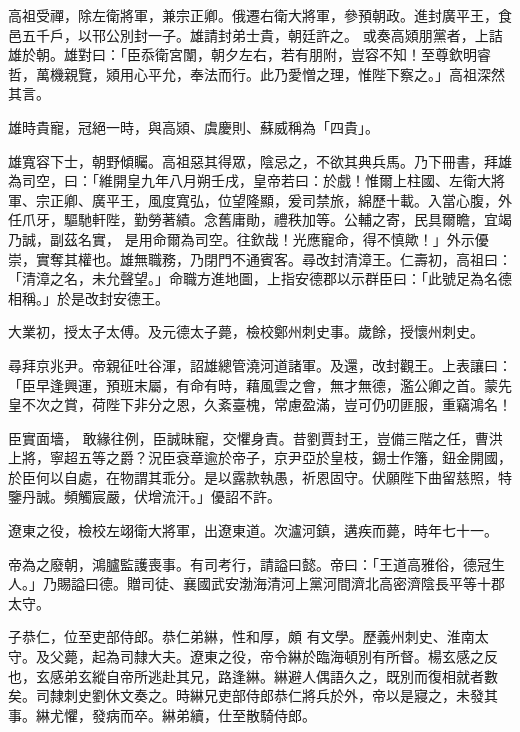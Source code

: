\begin{pinyinscope}
 高祖受禪，除左衛將軍，兼宗正卿。俄遷右衛大將軍，參預朝政。進封廣平王，食邑五千戶，以邗公別封一子。雄請封弟士貴，朝廷許之。
 或奏高熲朋黨者，上詰雄於朝。雄對曰：「臣忝衛宮闈，朝夕左右，若有朋附，豈容不知！至尊欽明睿哲，萬機親覽，熲用心平允，奉法而行。此乃愛憎之理，惟陛下察之。」高祖深然其言。



 雄時貴寵，冠絕一時，與高熲、虞慶則、蘇威稱為「四貴」。



 雄寬容下士，朝野傾矚。高祖惡其得眾，陰忌之，不欲其典兵馬。乃下冊書，拜雄為司空，曰：「維開皇九年八月朔壬戌，皇帝若曰：於戲！惟爾上柱國、左衛大將軍、宗正卿、廣平王，風度寬弘，位望隆顯，爰司禁旅，綿歷十載。入當心腹，外任爪牙，驅馳軒陛，勤勞著績。念舊庸勛，禮秩加等。公輔之寄，民具爾瞻，宜竭乃誠，副茲名實，
 是用命爾為司空。往欽哉！光應寵命，得不慎歟！」外示優崇，實奪其權也。雄無職務，乃閉門不通賓客。尋改封清漳王。仁壽初，高祖曰：「清漳之名，未允聲望。」命職方進地圖，上指安德郡以示群臣曰：「此號足為名德相稱。」於是改封安德王。



 大業初，授太子太傅。及元德太子薨，檢校鄭州刺史事。歲餘，授懷州刺史。



 尋拜京兆尹。帝親征吐谷渾，詔雄總管澆河道諸軍。及還，改封觀王。上表讓曰：「臣早逢興運，預班末屬，有命有時，藉風雲之會，無才無德，濫公卿之首。蒙先皇不次之賞，荷陛下非分之恩，久紊臺槐，常慮盈滿，豈可仍叨匪服，重竊鴻名！



 臣實面墻，
 敢緣往例，臣誠昧寵，交懼身責。昔劉賈封王，豈備三階之任，曹洪上將，寧超五等之爵？況臣袞章逾於帝子，京尹亞於皇枝，錫士作籓，鈕金開國，於臣何以自處，在物謂其乖分。是以露款執愚，祈恩固守。伏願陛下曲留慈照，特鑒丹誠。頻觸宸嚴，伏增流汗。」優詔不許。



 遼東之役，檢校左翊衛大將軍，出遼東道。次瀘河鎮，遘疾而薨，時年七十一。



 帝為之廢朝，鴻臚監護喪事。有司考行，請謚曰懿。帝曰：「王道高雅俗，德冠生人。」乃賜謚曰德。贈司徒、襄國武安渤海清河上黨河間濟北高密濟陰長平等十郡太守。



 子恭仁，位至吏部侍郎。恭仁弟綝，性和厚，頗
 有文學。歷義州刺史、淮南太守。及父薨，起為司隸大夫。遼東之役，帝令綝於臨海頓別有所督。楊玄感之反也，玄感弟玄縱自帝所逃赴其兄，路逢綝。綝避人偶語久之，既別而復相就者數矣。司隸刺史劉休文奏之。時綝兄吏部侍郎恭仁將兵於外，帝以是寢之，未發其事。綝尤懼，發病而卒。綝弟續，仕至散騎侍郎。




\end{pinyinscope}
